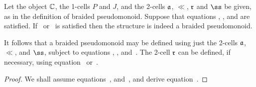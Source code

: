 \documentclass{robinthesisdraft}
\begin{document}
\begin{propn}
	Let the object $\C$, the 1-cells $P$ and $J$,
	and the 2-cells $\aa$, $\ll$, $\rr$ and $\ss$ be given, as in
	the definition of braided pseudomonoid. Suppose that equations ,
	,  and  are satisfied.
	If~ or~
	is satisfied then the structure is indeed a braided pseudomonoid.
	
	It follows that a braided pseudomonoid may be defined using just
	the 2-cells $\aa$, $\ll$, and $\ss$, subject to equations
	, ,  and~.
	The 2-cell $\rr$ can be defined, if necessary, using equation~
	or~.
\end{propn}
\begin{proof}
	We shall assume equations~,  and~,
	and derive equation~.
	

\end{proof}
\end{document}

